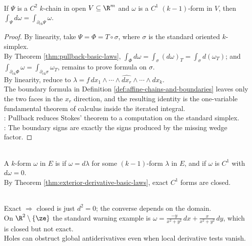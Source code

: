 \begin{theorem} \label{thm:stokes-theorem-differential-forms}\label{thm:forms-manifolds-stokes-main-source-todo} \\
If $\Psi$ is a $C^2$ $k$-chain in open $V\subseteq\R^m$ and $\omega$ is a $C^1$ $(k-1)$-form in $V$, then $\int_{\Psi}d\omega=\int_{\partial_{\mathrm{ch}}\Psi}\omega$.
\begin{proof}
By linearity, take $\Psi=\Phi=T\circ\sigma$, where $\sigma$ is the standard oriented $k$-simplex.\\
By Theorem \ref{thm:pullback-basic-laws}, $\int_{\Phi}d\omega =\int_{\sigma}(d\omega)_T =\int_{\sigma}d(\omega_T)$; and $\int_{\partial_{\mathrm{ch}}\Phi}\omega =\int_{\partial_{\mathrm{ch}}\sigma}\omega_T$, remains to prove formula on $\sigma$.\\
By linearity, reduce to $\lambda=f\,dx_1\wedge\cdots\wedge\widehat{dx_r}\wedge\cdots\wedge dx_k$.\\
The boundary formula in Definition \ref{def:affine-chains-and-boundaries} leaves only the two faces in the $x_r$ direction, and the resulting identity is the one-variable fundamental theorem of calculus inside the iterated integral.\\
: Pullback reduces Stokes' theorem to a computation on the standard simplex.\\
: The boundary signs are exactly the signs produced by the missing wedge factor.
\end{proof}
\end{theorem}

\begin{definition} \label{def:closed-and-exact-forms} \\
A $k$-form $\omega$ in $E$ is  if $\omega=d\lambda$ for some $(k-1)$-form $\lambda$ in $E$, and  if $\omega$ is $C^1$ with $d\omega=0$.\\
By Theorem \ref{thm:exterior-derivative-basic-laws}, exact $C^1$ forms are closed.
\end{definition}

\begin{perspective} \label{per:closed-exact-local-global} \\
Exact $\Rightarrow$ closed is just $d^2=0$; the converse depends on the domain.\\
On $\R^2\setminus\{\ze\}$ the standard warning example is $\omega=\frac{-y}{x^2+y^2}\,dx+\frac{x}{x^2+y^2}\,dy$, which is closed but not exact.\\
Holes can obstruct global antiderivatives even when local derivative tests vanish.
\end{perspective}

